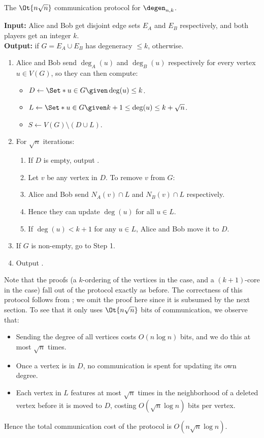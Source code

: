 \begin{Algorithm}\label{alg:nrootn}
  The $\Ot{n\sqrt{n}}$ communication protocol for $\degen_{n, k}$. \medskip

  \textbf{Input:} Alice and Bob get disjoint edge sets $E_A$ and $E_B$
    respectively, and both players get an integer $k$.\\
  \textbf{Output:} \true{} if $G = E_A \cup E_B$ has degeneracy $\leq k$, \fail{} otherwise.
  \begin{enumerate}
    \item Alice and Bob send $\deg_A(u)$ and $\deg_B(u)$ respectively for every
      vertex $u \in V(G)$, so they can then compute:
      \begin{itemize}
        \item $D \gets \Set*{ u \in G \given \deg(u) \leq k }$.
        \item $L \gets \Set*{ u \in G \given k + 1 \leq \deg(u) \leq k + \sqrt{n} }$.
        \item $S \gets V(G) \setminus (D \cup L)$.
      \end{itemize}
    \item For $\sqrt{n}$ iterations:
      \begin{enumerate}
        \item If $D$ is empty, output \fail.
        \item Let $v$ be any vertex in $D$. To remove $v$ from $G$:
        \item\label{step:Lnbrs} Alice and Bob send $N_A(v) \cap L$ and $N_B(v) \cap L$ respectively.
        \item\label{step:Lupdt} Hence they can update $\deg(u)$ for all $u \in L$.
        \item\label{step:Dmove} If $\deg(u) < k + 1$ for any $u \in L$,
          Alice and Bob move it to $D$.
      \end{enumerate}

    \item If $G$ is non-empty, go to Step 1.
    \item Output \true.
  \end{enumerate}
\end{Algorithm}
Note that the proofs (a $k$-ordering of the vertices in the \true{} case,
and a $(k + 1)$-core in the \fail{} case) fall out of the protocol exactly as before.
The correctness of this protocol follows from ; we omit
the proof here since it is subsumed by the next section.
To see that it only uses $\Ot{n \sqrt{n}}$ bits of communication, we observe
that:
\begin{itemize}
  \item Sending the degree of all vertices costs $O( n \log n )$ bits, and
    we do this at most $\sqrt{n}$ times.
  \item Once a vertex is in $D$, no communication is spent for updating its own degree.
  \item Each vertex in $L$ features at most $\sqrt{n}$ times in the neighborhood
    of a deleted vertex before it is moved to $D$, costing $O( \sqrt{n} \log n )$
    bits per vertex.
\end{itemize}
Hence the total communication cost of the protocol is $O( n\sqrt{n} \log n)$.

